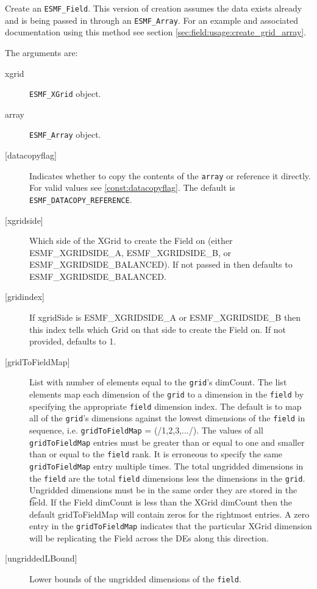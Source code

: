    Create an {\tt ESMF\_Field}. This version of creation
   assumes the data exists already and is being
   passed in through an {\tt ESMF\_Array}. For an example and
   associated documentation using this method see section
   \ref{sec:field:usage:create_grid_array}.
  
   The arguments are:
   \begin{description}
   \item [xgrid]
   {\tt ESMF\_XGrid} object.
   \item [array]
   {\tt ESMF\_Array} object.
   \item [{[datacopyflag]}]
   Indicates whether to copy the contents of the {\tt array} or reference it directly.
   For valid values see \ref{const:datacopyflag}. The default is
   {\tt ESMF\_DATACOPY\_REFERENCE}.
   \item [{[xgridside]}]
   Which side of the XGrid to create the Field on (either ESMF\_XGRIDSIDE\_A,
   ESMF\_XGRIDSIDE\_B, or ESMF\_XGRIDSIDE\_BALANCED). If not passed in then
   defaults to ESMF\_XGRIDSIDE\_BALANCED.
   \item [{[gridindex]}]
   If xgridSide is ESMF\_XGRIDSIDE\_A or ESMF\_XGRIDSIDE\_B then this index tells which Grid on
   that side to create the Field on. If not provided, defaults to 1.
   \item [{[gridToFieldMap]}]
   List with number of elements equal to the
   {\tt grid}'s dimCount. The list elements map each dimension
   of the {\tt grid} to a dimension in the {\tt field} by
   specifying the appropriate {\tt field} dimension index. The default is to
   map all of the {\tt grid}'s dimensions against the lowest dimensions of
   the {\tt field} in sequence, i.e. {\tt gridToFieldMap} = (/1,2,3,.../).
   The values of all {\tt gridToFieldMap} entries must be greater than or equal
   to one and smaller than or equal to the {\tt field} rank.
   It is erroneous to specify the same {\tt gridToFieldMap} entry
   multiple times. The total ungridded dimensions in the {\tt field}
   are the total {\tt field} dimensions less
   the dimensions in
   the {\tt grid}. Ungridded dimensions must be in the same order they are
   stored in the {\t field}.
   If the Field dimCount is less than the XGrid dimCount then the default
   gridToFieldMap will contain zeros for the rightmost entries. A zero
   entry in the {\tt gridToFieldMap} indicates that the particular
   XGrid dimension will be replicating the Field across the DEs along
   this direction.
   \item [{[ungriddedLBound]}]
   Lower bounds of the ungridded dimensions of the {\tt field}.

\end{description}
